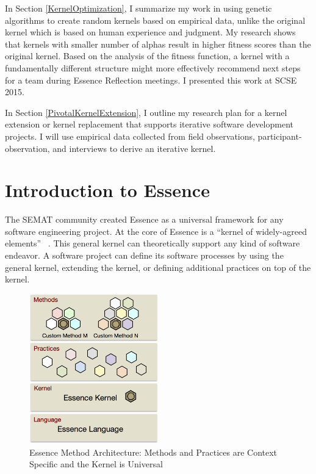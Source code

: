 \documentclass[preprint,12pt,3p]{elsarticle}
\begin{document}
In Section \ref{KernelOptimization}, I summarize my work in using genetic algorithms to create random kernels based on empirical data, unlike the original kernel which is based on human experience and judgment. My research shows that kernels with smaller number of alphas result in higher fitness scores than the original kernel. Based on the analysis of the fitness function, a kernel with a fundamentally different structure might more effectively recommend next steps for a team during Essence Reflection meetings. I presented this work at SCSE 2015.

In Section \ref{PivotalKernelExtension}, I outline my research plan for a kernel extension or kernel replacement that supports iterative software development projects. I will use empirical data collected from field observations, participant-observation, and interviews to derive an iterative kernel. 

\section{Introduction to Essence}
\label{Method}

The SEMAT community created Essence as a universal framework for any software engineering project. At the core of Essence is a ``kernel of widely-agreed elements'' ~\cite{JacobsonQueue}. This general kernel can theoretically support any kind of software endeavor. A software project can define its software processes by using the general kernel, extending the kernel, or defining additional practices on top of the kernel.

\begin{figure}[h]\vspace*{4pt}
\centerline{\includegraphics[width=2.2in]{kernel_images/EssenceLayers}}
\caption{Essence Method Architecture: Methods and Practices are Context Specific and the Kernel is Universal}\vspace*{-6pt}\label{EssenceLayers}
\end{figure}
\end{document}
